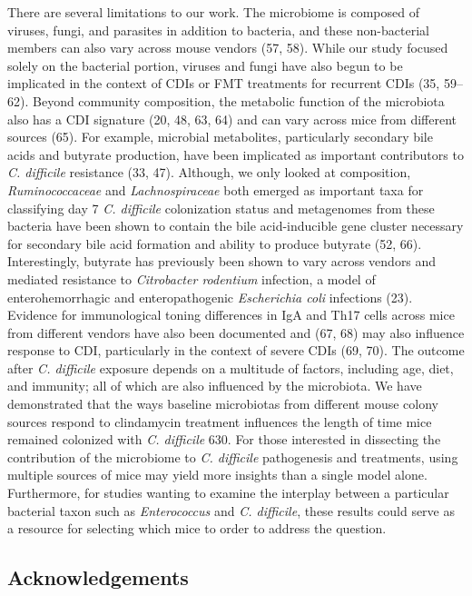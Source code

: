 \documentclass[11pt,]{article}
\begin{document}
There are several limitations to our work. The microbiome is composed of
viruses, fungi, and parasites in addition to bacteria, and these
non-bacterial members can also vary across mouse vendors (57, 58). While
our study focused solely on the bacterial portion, viruses and fungi
have also begun to be implicated in the context of CDIs or FMT
treatments for recurrent CDIs (35, 59--62). Beyond community
composition, the metabolic function of the microbiota also has a CDI
signature (20, 48, 63, 64) and can vary across mice from different
sources (65). For example, microbial metabolites, particularly secondary
bile acids and butyrate production, have been implicated as important
contributors to \emph{C. difficile} resistance (33, 47). Although, we
only looked at composition, \emph{Ruminococcaceae} and
\emph{Lachnospiraceae} both emerged as important taxa for classifying
day 7 \emph{C. difficile} colonization status and metagenomes from these
bacteria have been shown to contain the bile acid-inducible gene cluster
necessary for secondary bile acid formation and ability to produce
butyrate (52, 66). Interestingly, butyrate has previously been shown to
vary across vendors and mediated resistance to \emph{Citrobacter
rodentium} infection, a model of enterohemorrhagic and enteropathogenic
\emph{Escherichia coli} infections (23). Evidence for immunological
toning differences in IgA and Th17 cells across mice from different
vendors have also been documented and (67, 68) may also influence
response to CDI, particularly in the context of severe CDIs (69, 70).
The outcome after \emph{C. difficile} exposure depends on a multitude of
factors, including age, diet, and immunity; all of which are also
influenced by the microbiota. We have demonstrated that the ways
baseline microbiotas from different mouse colony sources respond to
clindamycin treatment influences the length of time mice remained
colonized with \emph{C. difficile} 630. For those interested in
dissecting the contribution of the microbiome to \emph{C. difficile}
pathogenesis and treatments, using multiple sources of mice may yield
more insights than a single model alone. Furthermore, for studies
wanting to examine the interplay between a particular bacterial taxon
such as \emph{Enterococcus} and \emph{C. difficile}, these results could
serve as a resource for selecting which mice to order to address the
question.

\newpage

\subsection{Acknowledgements}\label{acknowledgements}
\end{document}
